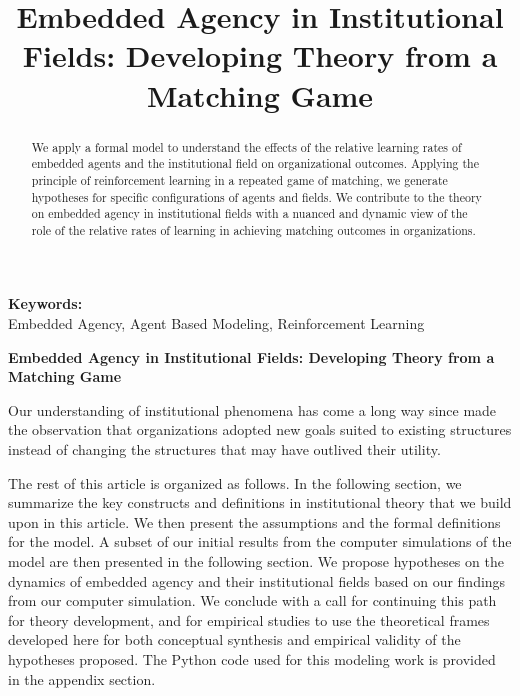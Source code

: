 \documentclass[12pt,letterpaper]{article}
\begin{document}
\title{Embedded Agency in Institutional Fields: Developing Theory from a Matching Game}
\date{}
\maketitle

\begin{abstract} 
\normalsize 
We apply a formal model to understand the effects of the relative learning rates of embedded agents and the institutional field on organizational outcomes. Applying the principle of reinforcement learning in a repeated game of matching, we generate hypotheses for specific configurations of agents and fields. We contribute to the theory on embedded agency in institutional fields with a nuanced and dynamic view of the role of the relative rates of learning in achieving matching outcomes in organizations.
\end{abstract}


{\textbf{Keywords:} \\\indent Embedded Agency, Agent Based Modeling, Reinforcement Learning}

\newpage
\pagestyle{fancy}
\fancyhf{}
\rhead{\thepage}
\begin{center}
\textbf{Embedded Agency in Institutional Fields: Developing Theory from a Matching Game}
\end{center}
Our understanding of  institutional phenomena has come a long way since \cite{Selznick1957} made the observation that organizations adopted new goals suited to existing structures  instead of changing the structures that may have outlived their utility. 

The rest of this article is organized as follows. In the following section, we summarize the key constructs and definitions in institutional theory that we build upon in this article. We then present the assumptions and the formal definitions for the model. A subset of our initial results from the computer simulations of the model are then presented in the following section. We propose hypotheses on the dynamics of embedded agency and their institutional fields based on our findings from our computer simulation. We conclude with a call for continuing this path for theory development, and for empirical studies to use the theoretical frames developed here for both conceptual synthesis and empirical validity of the hypotheses proposed. The Python code used for this modeling work is provided in the appendix section.
\end{document}
